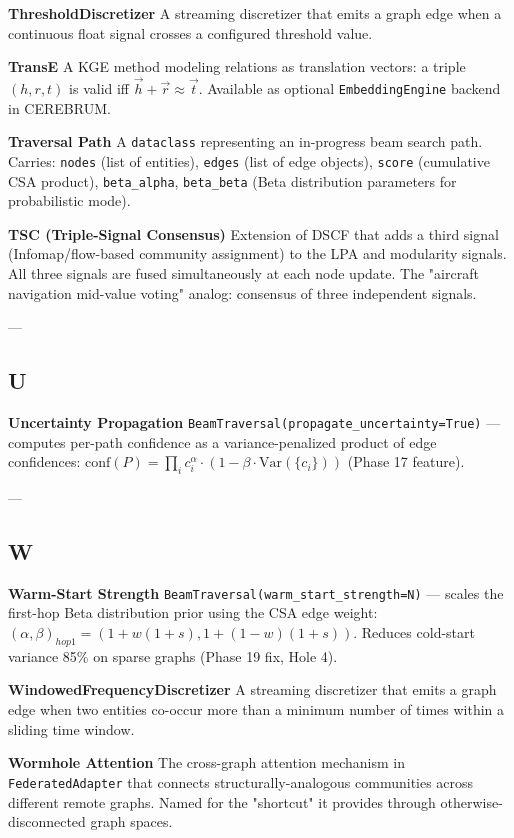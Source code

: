 \documentclass[11pt,article,oneside]{memoir}
\begin{document}
\textbf{ThresholdDiscre\-tizer}
A streaming discretizer that emits a graph edge when a continuous float signal crosses a configured threshold value.

\textbf{TransE}
A KGE method modeling relations as translation vectors: a triple $(h, r, t)$ is valid iff $\vec{h} + \vec{r} \approx \vec{t}$. Available as optional \texttt{EmbeddingEngine} backend in CEREBRUM.

\textbf{Traversal Path}
A \texttt{dataclass} repre\-senting an in-progress beam search path. Carries: \texttt{nodes} (list of entities), \texttt{edges} (list of edge objects), \texttt{score} (cumulative CSA product), \texttt{beta\_alpha}, \texttt{beta\_beta} (Beta distr\-ibution parameters for proba\-bilistic mode).

\textbf{TSC (Triple-Signal Consensus)}
Extension of DSCF that adds a third signal (Infomap/flow-based community assignment) to the LPA and modularity signals. All three signals are fused simul\-taneously at each node update. The "aircraft navigation mid-value voting" analog: consensus of three independent signals.

---

\subsection{U}

\textbf{Uncertainty Propagation}
\texttt{BeamTraversal(propagate\_uncertainty=True)} — computes per-path confidence as a variance-penalized product of edge confidences: $\text{conf}(P) = \prod_i c_i^\alpha \cdot (1 - \beta \cdot \text{Var}(\{c_i\}))$ (Phase 17 feature).

---

\subsection{W}

\textbf{Warm-Start Strength}
\texttt{BeamTraversal(warm\_start\_strength=N)} — scales the first-hop Beta distr\-ibution prior using the CSA edge weight: $(\alpha, \beta)_{hop1} = (1 + w(1+s), 1 + (1-w)(1+s))$. Reduces cold-start variance 85\% on sparse graphs (Phase 19 fix, Hole 4).

\textbf{WindowedFrequencyDiscre\-tizer}
A streaming discretizer that emits a graph edge when two entities co-occur more than a minimum number of times within a sliding time window.

\textbf{Wormhole Attention}
The cross-graph attention mechanism in \texttt{FederatedAdapter} that connects struc\-turally-analogous communities across different remote graphs. Named for the "shortcut" it provides through otherwise-disco\-nnected graph spaces.
\end{document}
